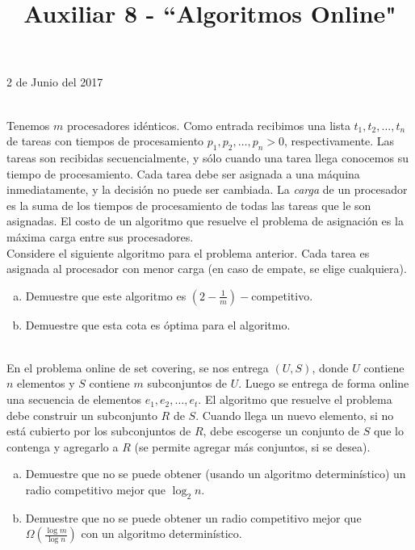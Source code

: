 \documentclass[dcc,uchile]{fcfmcourse}
\title{Auxiliar 8 - ``Algoritmos Online"}
\begin{document}
\maketitle
\begin{center}
2 de Junio del 2017
\end{center}
\vspace{-1ex}


\begin{problems}
\\
Tenemos $m$ procesadores idénticos. Como entrada recibimos una lista $t_{1}, t_{2}, \ldots, t_{n}$ de tareas con tiempos de procesamiento $p_{1}, p_{2}, \ldots, p_{n} > 0$, respectivamente. Las tareas son recibidas secuencialmente, y sólo cuando una tarea llega conocemos su tiempo de procesamiento. Cada tarea debe ser asignada a una máquina inmediatamente, y la decisión no puede ser cambiada. La \textit{carga} de un procesador es la suma de los tiempos de procesamiento de todas las tareas que le son asignadas. El costo de un algoritmo que resuelve el problema de asignación es la máxima carga entre sus procesadores.\\
Considere el siguiente algoritmo para el problema anterior. Cada tarea es asignada al procesador con menor carga (en caso de empate, se elige cualquiera).
\begin{enumerate}[a)]
    \item Demuestre que este algoritmo es $\left(2-\frac{1}{m}\right)-$competitivo.
    \item Demuestre que esta cota es óptima para el algoritmo.
\end{enumerate}
\\
En el problema online de set covering, se nos entrega $(U, S)$, donde $U$ contiene $n$ elementos y $S$ contiene $m$ subconjuntos de $U$. Luego se entrega de forma online una secuencia de elementos $e_{1}, e_{2}, \ldots, e_{t}$. El algoritmo que resuelve el problema debe construir un subconjunto $R$ de $S$. Cuando llega un nuevo elemento, si no está cubierto por los subconjuntos de $R$, debe escogerse un conjunto de $S$ que lo contenga y agregarlo a $R$ (se permite agregar más conjuntos, si se desea).
\begin{enumerate}[a)]
    \item Demuestre que no se puede obtener (usando un algoritmo determinístico) un radio competitivo mejor que $\log_{2} n$.
    \item Demuestre que no se puede obtener un radio competitivo mejor que $\Omega\left(\frac{\log m}{\log n}\right)$ con un algoritmo determinístico.
\end{enumerate}
\end{problems}
\end{document}
